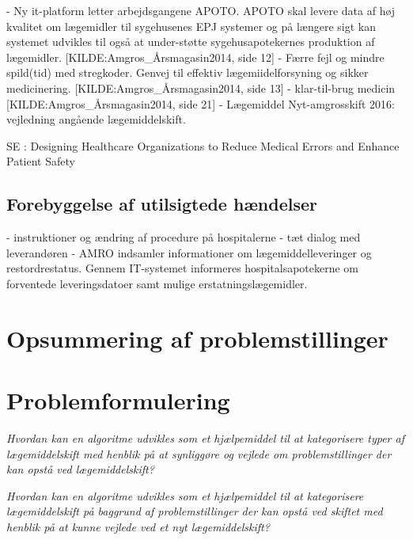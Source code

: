 - Ny it-platform letter arbejdsgangene APOTO. APOTO skal levere data af høj kvalitet om lægemidler til sygehusenes EPJ systemer og på længere sigt kan
systemet udvikles til også at under-støtte sygehusapotekernes produktion af lægemidler.  [KILDE:Amgros_Årsmagasin2014, side 12]
- Færre fejl og mindre spild(tid) med stregkoder. Genvej til effektiv lægemiidelforsyning og sikker medicinering. 
[KILDE:Amgros_Årsmagasin2014, side 13]
- klar-til-brug medicin [KILDE:Amgros_Årsmagasin2014, side 21]
- Lægemiddel Nyt-amgrosskift 2016: vejledning angående lægemiddelskift.

SE : Designing Healthcare Organizations to Reduce Medical Errors and Enhance Patient Safety

\subsection{Forebyggelse af utilsigtede hændelser}

- instruktioner og ændring af procedure på hospitalerne
- tæt dialog med leverandøren
- AMRO indsamler informationer om lægemiddelleveringer og restordrestatus. Gennem IT-systemet informeres
hospitalsapotekerne om forventede leveringsdatoer samt mulige erstatningslægemidler.


\section{Opsummering af problemstillinger}
\section{Problemformulering}
\textit{Hvordan kan en algoritme udvikles som et hjælpemiddel til at kategorisere typer af lægemiddelskift med henblik på at synliggøre og vejlede om problemstillinger der kan opstå ved lægemiddelskift?}

\textit{Hvordan kan en algoritme udvikles som et hjælpemiddel til at kategorisere lægemiddelskift på baggrund af problemstillinger der kan opstå ved skiftet med henblik på at kunne vejlede ved et nyt lægemiddelskift?} 


